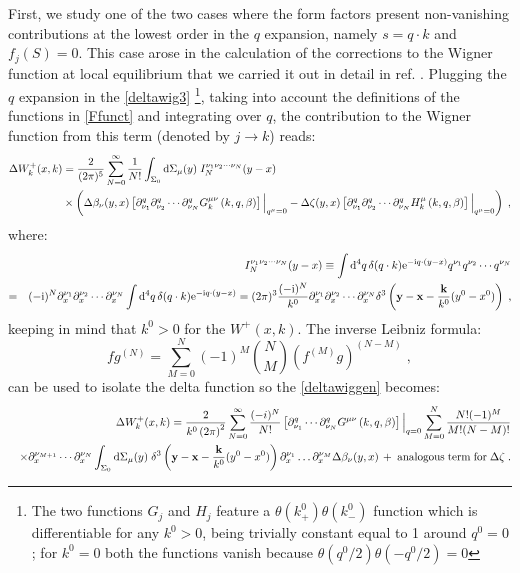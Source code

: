 \documentclass[prd,superscriptaddress,nofootinbib,notitlepage]{revtex4-1}
\newcommand{\e}{{\rm e}}
\newcommand{\di}{{\rm d}}
\newcommand{\ii}{{\rm i}}
\newcommand{\kb}{{\mathbf{k}}}
\newcommand{\x}{{\mathbf{x}}}
\newcommand{\y}{{\mathbf{y}}}
\begin{document}
First, we study one of the two cases where the form factors present non-vanishing contributions at the lowest 
order in the $q$ expansion, namely $s=q \cdot k$ and $f_j(S)=0$. This case arose in the calculation of the corrections
to the Wigner function at local equilibrium that we carried it out in detail in ref. \cite{Sheng:2025cjk}. 
Plugging the $q$ expansion in the \eqref{deltawig3} \footnote{The two functions $G_{j}$ and $H_{j}$ feature a $\theta(k^0_+)\theta(k^0_-)$ function which is differentiable for any $k^0 > 0$, being trivially constant equal to 1 
around $q^0=0$; for $k^0=0$ both the functions vanish because $\theta(q^0/2)\theta(-q^0/2) = 0$},
taking into account the definitions of the functions in \eqref{Ffunct} and integrating over $q$, the contribution
to the Wigner function from this term (denoted by $j \to k$) reads:
%
\begin{equation}\label{deltawiggen}
\begin{split}
    \Delta W_k^+(x,k) &= \frac{2}{(2\pi)^5} \sum_{N=0}^{\infty}\frac{1}{N!}\int_{\Sigma_0} \di \Sigma_{\mu}(y) 
\; I_{N}^{\nu_{1}\nu_{2}\cdots\nu_{N}}(y-x)  \\
& \times \left( \Delta\beta_\nu(y,x) \left[\partial_{\nu_{1}}^{q}\partial_{\nu_{2}}^{q}
\cdots\partial_{\nu_{N}}^{q} G_k^{\mu\nu}\left(k,q,\beta\right)\right]\Big|_{q^{\mu}=0} - \Delta\zeta(y,x) 
\left[\partial_{\nu_{1}}^{q}\partial_{\nu_{2}}^{q}\cdots\partial_{\nu_{N}}^{q}
H_k^{\mu}\left(k,q,\beta\right)\right]\Big|_{q^{\mu}=0} \right)\;,
\end{split}
\end{equation}
%
where: 
%
\begin{eqnarray}\label{integrale y-x}
&& I_{N}^{\nu_{1}\nu_{2}\cdots\nu_{N}}(y-x)\equiv\int \di^{4}q\, \delta(q \cdot k)
\e^{-\ii q\cdot(y-x)}q^{\nu_{1}}q^{\nu_{2}}\cdots q^{\nu_{N}} \nonumber \\
=&& (-\ii)^N \partial_x^{\nu_1}\partial_x^{\nu_2}\cdots \partial_x^{\nu_N} 
\int \di^{4}q\,\delta(q\cdot k) \e^{-\ii q\cdot(y-x)} = (2\pi)^3
\frac{(-\ii)^N}{k^0} \partial_x^{\nu_1}\partial_x^{\nu_2}\cdots \partial_x^{\nu_N} \delta^3\left(
\y-\x - \frac{\kb}{k^0} (y^0-x^0) \right)\;,
\end{eqnarray}
%
keeping in mind that $k^0 > 0$ for the $W^+(x,k)$. The inverse Leibniz formula:
%
$$
  f g^{(N)} = \sum_{M=0}^N (-1)^M \binom{N}{M} (f^{(M)} g)^{(N-M)}\;,
$$
%
can be used to isolate the delta function so the \eqref{deltawiggen} becomes:
%
\begin{eqnarray}\label{deltawig5}
&& \Delta W_k^+(x,k) = \frac{2}{k^0\left(2\pi\right)^2}\sum_{N=0}^{\infty} \frac{(-i)^N}{N!}
\left[\partial^{q}_{\nu_{1}}\cdots\partial^{q}_{\nu_{N}}G^{\mu\nu}\left(k,q,\beta\right)\right]\Big|_{q=0}  
\sum_{M=0}^N \frac{N!(-1)^M}{M!(N-M)!}
 \nonumber \\
&& \times \partial^{\nu_{M+1}}_{x}\cdots\partial^{\nu_{N}}_{x}\int_{\Sigma_{\text{0}}} \di \Sigma_{\mu}(y)
\; \delta^3\left(\y-\x - \frac{\kb}{k^0} (y^0-x^0) \right)\partial^{\nu_{1}}_{x}\ldots\partial^{\nu_{M}}_{x}
\Delta\beta_\nu(y,x) \, +\; {\rm analogous \; term \; for \; 
 \Delta\zeta}\;.
\end{eqnarray}
\end{document}
